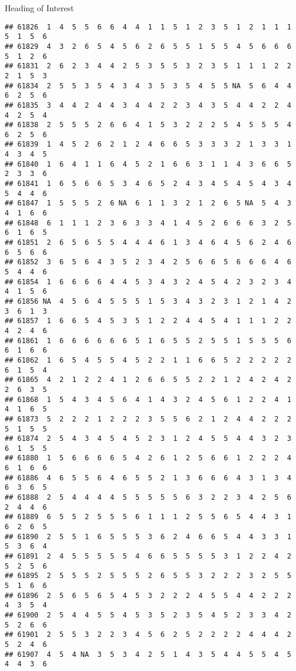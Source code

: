 \documentclass[
  ignorenonframetext,
]{beamer}
\begin{document}
\begin{frame}[fragile]{Heading of Interest}
\begin{verbatim}
## 61826  1  4  5  5  6  6  4  4  1  1  5  1  2  3  5  1  2  1  1  1  5  1  5  6
## 61829  4  3  2  6  5  4  5  6  2  6  5  5  1  5  5  4  5  6  6  6  5  1  2  6
## 61831  2  6  2  3  4  4  2  5  3  5  5  3  2  3  5  1  1  1  2  2  2  1  5  3
## 61834  2  5  5  3  5  4  3  4  3  5  3  5  4  5  5 NA  5  6  4  4  6  2  5  6
## 61835  3  4  4  2  4  4  3  4  4  2  2  3  4  3  5  4  4  2  2  4  4  2  5  4
## 61838  2  5  5  5  2  6  6  4  1  5  3  2  2  2  5  4  5  5  5  4  6  2  5  6
## 61839  1  4  5  2  6  2  1  2  4  6  6  5  3  3  3  2  1  3  3  1  4  3  4  5
## 61840  1  6  4  1  1  6  4  5  2  1  6  6  3  1  1  4  3  6  6  5  2  3  3  6
## 61841  1  6  5  6  6  5  3  4  6  5  2  4  3  4  5  4  5  4  3  4  5  4  4  6
## 61847  1  5  5  5  2  6 NA  6  1  1  3  2  1  2  6  5 NA  5  4  3  4  1  6  6
## 61848  6  1  1  1  2  3  6  3  3  4  1  4  5  2  6  6  6  3  2  5  6  1  6  5
## 61851  2  6  5  6  5  5  4  4  4  6  1  3  4  6  4  5  6  2  4  6  6  5  6  6
## 61852  3  6  5  6  4  3  5  2  3  4  2  5  6  6  5  6  6  6  4  6  5  4  4  6
## 61854  1  6  6  6  6  4  4  5  3  4  3  2  4  5  4  2  3  2  3  4  4  1  5  6
## 61856 NA  4  5  6  4  5  5  5  1  5  3  4  3  2  3  1  2  1  4  2  3  6  1  3
## 61857  1  6  6  5  4  5  3  5  1  2  2  4  4  5  4  1  1  1  2  2  4  2  4  6
## 61861  1  6  6  6  6  6  6  5  1  6  5  5  2  5  5  1  5  5  5  6  6  1  6  6
## 61862  1  6  5  4  5  5  4  5  2  2  1  1  6  6  5  2  2  2  2  2  6  1  5  4
## 61865  4  2  1  2  2  4  1  2  6  6  5  5  2  2  1  2  4  2  4  2  2  6  3  5
## 61868  1  5  4  3  4  5  6  4  1  4  3  2  4  5  6  1  2  2  4  1  4  1  6  5
## 61873  5  2  2  2  1  2  2  2  3  5  5  6  2  1  2  4  4  2  2  2  5  1  5  5
## 61874  2  5  4  3  4  5  4  5  2  3  1  2  4  5  5  4  4  3  2  3  6  1  5  5
## 61880  1  5  6  6  6  6  5  4  2  6  1  2  5  6  6  1  2  2  2  4  6  1  6  6
## 61886  4  6  5  5  6  4  6  5  5  2  1  3  6  6  6  4  3  1  3  4  6  3  6  5
## 61888  2  5  4  4  4  4  5  5  5  5  5  6  3  2  2  3  4  2  5  6  2  4  4  6
## 61889  6  5  5  2  5  5  5  6  1  1  1  2  5  5  6  5  4  4  3  1  6  2  6  5
## 61890  2  5  5  1  6  5  5  5  3  6  2  4  6  6  5  4  4  3  3  1  5  3  6  4
## 61891  2  4  5  5  5  5  5  4  6  6  5  5  5  5  3  1  2  2  4  2  5  2  5  6
## 61895  2  5  5  5  2  5  5  5  2  6  5  5  3  2  2  2  3  2  5  5  5  1  6  6
## 61896  2  5  6  5  6  5  4  5  3  2  2  2  4  5  5  4  4  2  2  2  4  3  5  4
## 61900  2  5  4  4  5  5  4  5  3  5  2  3  5  4  5  2  3  3  4  2  5  2  6  6
## 61901  2  5  5  3  2  2  3  4  5  6  2  5  2  2  2  2  4  4  4  2  5  2  4  6
## 61907  4  5  4 NA  3  5  3  4  2  5  1  4  3  5  4  4  5  5  4  5  4  4  3  6

\end{verbatim}
\end{frame}
\end{document}
